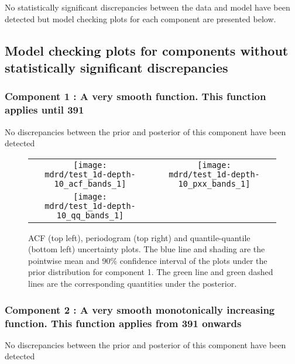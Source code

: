 \documentclass{article} %
\begin{document}
No statistically significant discrepancies between the data and model have been detected but model checking plots for each component are presented below.

\subsection{Model checking plots for components without statistically significant discrepancies}

\subsubsection{Component 1 : A very smooth function. This function applies until  391}

No discrepancies between the prior and posterior of this component have been detected

\begin{figure}[H]
\newcommand{\wmgd}{0.5\columnwidth}
\newcommand{\hmgd}{3.0cm}
\newcommand{\mdrd}{test_1d-depth-10}
\newcommand{\mbm}{\hspace{-0.3cm}}
\begin{tabular}{cc}
\mbm \texttt{[image: \\mdrd/test\_1d-depth-10\_acf\_bands\_1]} & \texttt{[image: \\mdrd/test\_1d-depth-10\_pxx\_bands\_1]} \\
\mbm \texttt{[image: \\mdrd/test\_1d-depth-10\_qq\_bands\_1]}
\end{tabular}
\caption{
ACF (top left), periodogram (top right) and quantile-quantile (bottom left) uncertainty plots.
The blue line and shading are the pointwise mean and 90\% confidence interval of the plots under the prior distribution for component 1.
The green line and green dashed lines are the corresponding quantities under the posterior.}
\label{fig:check1}
\end{figure}

\subsubsection{Component 2 : A very smooth monotonically increasing function. This function applies from  391 onwards}

No discrepancies between the prior and posterior of this component have been detected
\end{document}
